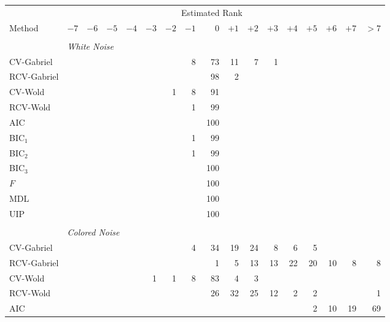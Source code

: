\begin{table}\label{T:rank-est-strong-sparse}
    \tiny
    \centering    
    \begin{tabular}{lrrrrrrrrrrrrrrrr}
        \toprule
        &\multicolumn{15}{c}{\scriptsize{Estimated Rank}} \\
        \cmidrule{2-17}
        \scriptsize{Method}
            & $-7$ & $-6$ & $-5$ & $-4$ & $-3$ & $-2$ & $-1$ 
            & $\phantom{+}0$ 
            & $+1$ & $+2$ & $+3$ & $+4$ & $+5$ & $+6$ & $+7$ & $> 7$ \\
        \midrule
        \\
        &\multicolumn{16}{l}{\scriptsize{\textit{White Noise}}} \\
CV-Gabriel &  &  &  &  &  &  &  8 &  73 &  11 &  7 &  1 &  &  &  &  & \\ 
 RCV-Gabriel &  &  &  &  &  &  &  &  98 &  2 &  &  &  &  &  &  & \\ 
 CV-Wold &  &  &  &  &  &  1 &  8 &  91 &  &  &  &  &  &  &  & \\ 
 RCV-Wold &  &  &  &  &  &  &  1 &  99 &  &  &  &  &  &  &  & \\ 
 AIC &  &  &  &  &  &  &  &  100 &  &  &  &  &  &  &  & \\ 
 BIC$_1$ &  &  &  &  &  &  &  1 &  99 &  &  &  &  &  &  &  & \\ 
 BIC$_2$ &  &  &  &  &  &  &  1 &  99 &  &  &  &  &  &  &  & \\ 
 BIC$_3$ &  &  &  &  &  &  &  &  100 &  &  &  &  &  &  &  & \\ 
 $F$ &  &  &  &  &  &  &  &  100 &  &  &  &  &  &  &  & \\ 
 MDL &  &  &  &  &  &  &  &  100 &  &  &  &  &  &  &  & \\ 
 UIP &  &  &  &  &  &  &  &  100 &  &  &  &  &  &  &  & \\ 
         \\
        &\multicolumn{16}{l}{\scriptsize{\textit{Colored Noise}}} \\
CV-Gabriel &  &  &  &  &  &  &  4 &  34 &  19 &  24 &  8 &  6 &  5 &  &  & \\ 
 RCV-Gabriel &  &  &  &  &  &  &  &  1 &  5 &  13 &  13 &  22 &  20 &  10 &  8 &  8\\ 
 CV-Wold &  &  &  &  &  1 &  1 &  8 &  83 &  4 &  3 &  &  &  &  &  & \\ 
 RCV-Wold &  &  &  &  &  &  &  &  26 &  32 &  25 &  12 &  2 &  2 &  &  &  1\\ 
 AIC &  &  &  &  &  &  &  &  &  &  &  &  &  2 &  10 &  19 &  69\\ 

\end{tabular}
\end{table}
